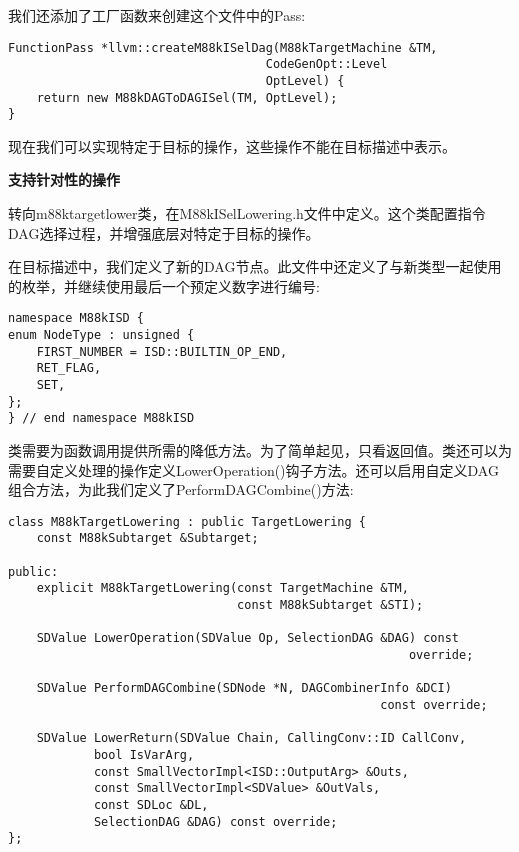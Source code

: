 我们还添加了工厂函数来创建这个文件中的Pass:\par

\begin{lstlisting}[caption={}]
FunctionPass *llvm::createM88kISelDag(M88kTargetMachine &TM,
									CodeGenOpt::Level
									OptLevel) {
	return new M88kDAGToDAGISel(TM, OptLevel);
}
\end{lstlisting}

现在我们可以实现特定于目标的操作，这些操作不能在目标描述中表示。\par

\hspace*{\fill} \par %
\textbf{支持针对性的操作}

转向m88ktargetlower类，在M88kISelLowering.h文件中定义。这个类配置指令DAG选择过程，并增强底层对特定于目标的操作。\par

在目标描述中，我们定义了新的DAG节点。此文件中还定义了与新类型一起使用的枚举，并继续使用最后一个预定义数字进行编号:\par

\begin{lstlisting}[caption={}]
namespace M88kISD {
enum NodeType : unsigned {
	FIRST_NUMBER = ISD::BUILTIN_OP_END,
	RET_FLAG,
	SET,
};
} // end namespace M88kISD
\end{lstlisting}

类需要为函数调用提供所需的降低方法。为了简单起见，只看返回值。类还可以为需要自定义处理的操作定义LowerOperation()钩子方法。还可以启用自定义DAG组合方法，为此我们定义了PerformDAGCombine()方法:\par

\begin{lstlisting}[caption={}]
class M88kTargetLowering : public TargetLowering {
	const M88kSubtarget &Subtarget;
	
public:
	explicit M88kTargetLowering(const TargetMachine &TM,
								const M88kSubtarget &STI);
	
	SDValue LowerOperation(SDValue Op, SelectionDAG &DAG) const
														override;
	
	SDValue PerformDAGCombine(SDNode *N, DAGCombinerInfo &DCI)
													const override;
	
	SDValue LowerReturn(SDValue Chain, CallingConv::ID CallConv,
			bool IsVarArg,
			const SmallVectorImpl<ISD::OutputArg> &Outs,
			const SmallVectorImpl<SDValue> &OutVals,
			const SDLoc &DL,
			SelectionDAG &DAG) const override;
};
\end{lstlisting}

